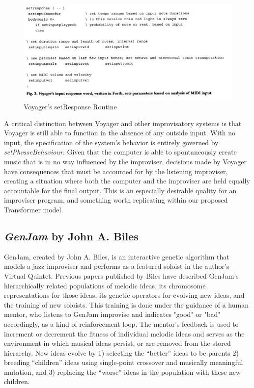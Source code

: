 \documentclass[../main.tex]{subfiles}
\begin{document}
\begin{figure}[htbp]
    \includegraphics[width=1\textwidth,]{imgs/voyager_setresponse.png}
    \caption{Voyager's setResponse Routine}
    \label{fig:voyager_setresponse}
\end{figure}

A critical distinction between Voyager and other improvisatory systems is that Voyager is still able to function in the absence of any outside input. With no input, the specification of the system's behavior is entirely governed by \textit{setPhraseBehaviour}. Given that the computer is able to spontaneously create music that is in no way influenced by the improviser, decisions made by Voyager have consequences that must be accounted for by the listening improviser, creating a situation where both the computer and the improviser are held equally accountable for the final output. This is an especially desirable quality for an improviser program, and something worth replicating within our proposed Transformer model.

\subsection{\textit{GenJam} by John A. Biles}
GenJam\cite{Biles:1}, created by John A. Biles, is an interactive genetic algorithm that models a jazz improviser and performs as a featured soloist in the author’s Virtual Quintet. Previous papers published by Biles have described GenJam's hierarchically related populations of melodic ideas, its chromosome representations for those ideas, its genetic operators for evolving new ideas, and the training of new soloists. This training is done under the guidance of a human mentor, who listens to GenJam improvise and indicates "good" or "bad" accordingly, as a kind of reinforcement loop. The mentor's feedback is used to increment or decrement the fitness of individual melodic ideas and serves as the environment in which musical ideas persist, or are removed from the stored hierarchy. New ideas evolve by 1) selecting the “better” ideas to be parents 2) breeding “children” ideas using single-point crossover and musically meaningful mutation, and 3) replacing the “worse” ideas in the population with these new children.
\end{document}
